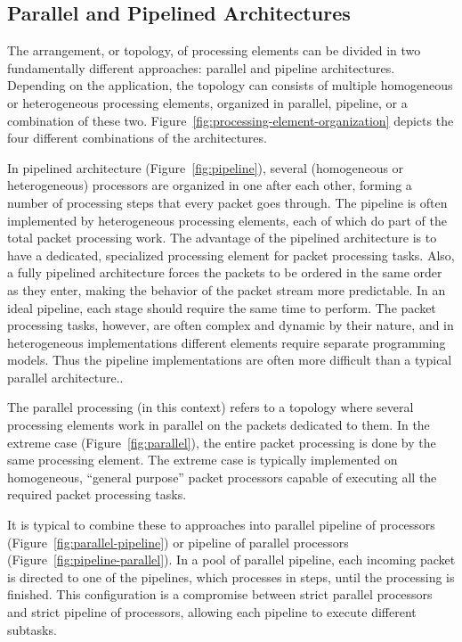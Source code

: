 \subsection{Parallel and Pipelined Architectures}
The arrangement, or topology, of processing elements can be divided in two fundamentally different approaches: parallel and pipeline architectures. Depending on the application, the topology can consists of multiple homogeneous or heterogeneous processing elements, organized in parallel, pipeline, or a combination of these two. Figure~\ref{fig:processing-element-organization} depicts the four different combinations of the architectures.~\cite{Giladi:2008:Network}

In pipelined architecture (Figure~\ref{fig:pipeline}), several (homogeneous or heterogeneous) processors are organized in one after each other, forming a number of processing steps that every packet goes through. The pipeline is often implemented by heterogeneous processing elements, each of which do part of the total packet processing work. The advantage of the pipelined architecture is to have a dedicated, specialized processing element for packet processing tasks. Also, a fully pipelined architecture forces the packets to be ordered in the same order as they enter, making the behavior of the packet stream more predictable. In an ideal pipeline, each stage should require the same time to perform. The packet processing tasks, however, are often complex and dynamic by their nature, and in heterogeneous implementations different elements require separate programming models. Thus the pipeline implementations are often more difficult than a typical parallel architecture..~\cite{Giladi:2008:Network}

The parallel processing (in this context) refers to a topology where several processing elements work in parallel on the packets dedicated to them. In the extreme case (Figure~\ref{fig:parallel}), the entire packet processing is done by the same processing element. The extreme case is typically implemented on homogeneous, ``general purpose'' packet processors capable of executing all the required packet processing tasks.~\cite{Giladi:2008:Network}

It is typical to combine these to approaches into parallel pipeline of processors (Figure~\ref{fig:parallel-pipeline}) or pipeline of parallel processors (Figure~\ref{fig:pipeline-parallel}). In a pool of parallel pipeline, each incoming packet is directed to one of the pipelines, which processes in steps, until the processing is finished. This configuration is a compromise between strict parallel processors and strict pipeline of processors, allowing each pipeline to execute different subtasks.~\cite{Giladi:2008:Network}

